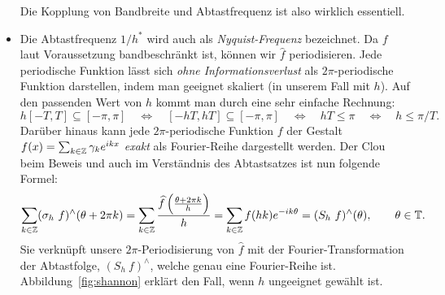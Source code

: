 \begin{remark}
\begin{itemize}
\begin{figure}[ht]
  \end{figure}
  Die Kopplung von Bandbreite und Abtastfrequenz ist also wirklich essentiell.
\item Die Abtastfrequenz $ 1 / h^{*} $ wird auch als \emph{Nyquist-Frequenz} bezeichnet. Da $ f $ 
laut
  Voraussetzung bandbeschränkt ist, können wir $ \widehat{f} $ periodisieren. Jede periodische
  Funktion lässt sich \emph{ohne Informationsverlust} als $ 2\pi $-periodische Funktion darstellen, 
  indem man geeignet skaliert (in unserem Fall mit $ h $). Auf den passenden Wert von $ h $ kommt 
  man durch eine sehr einfache Rechnung:
  \[
    h [-T, T] \subseteq [-\pi, \pi] \quad \Leftrightarrow \quad 
    [-hT, hT] \subseteq [-\pi, \pi] \quad \Leftrightarrow \quad 
    hT \leq \pi \quad \Leftrightarrow \quad 
    h \leq \pi / T.
  \]
  Darüber hinaus kann jede $ 2\pi $-periodische Funktion $ f $ der Gestalt
  $ f(x) = \sum_{k \in \mathbb{Z}} \gamma_{k}e^{ikx} $ \emph{exakt} als Fourier-Reihe dargestellt werden. 
  Der Clou beim Beweis und auch im Verständnis des Abtastsatzes ist nun folgende Formel:
  \[
      \sum_{k \in \mathbb{Z}} (\sigma_{h} \ f)^{\wedge}(\theta + 2 \pi k)
    = \sum_{k \in \mathbb{Z}} \frac{\widehat{f} \left( \frac{\theta + 2\pi k}{h} \right)}{h}
    = \sum_{k \in \mathbb{Z}} f(hk) e^{-ik\theta} 
    = (S_{h} \ f)^{\wedge}(\theta),
      \qquad \theta \in \mathbb{T}.
  \]
  Sie verknüpft unsere $ 2\pi $-Periodisierung von $ \widehat{f} $ mit der Fourier-Transformation 
  der Abtastfolge, $ (S_{h} \ f)^{\wedge} $, welche genau eine Fourier-Reihe ist. 
  Abbildung~\ref{fig:shannon} erklärt den Fall, wenn $ h $ ungeeignet gewählt ist.
  \begin{figure}[ht]
  \centering
  \begin{minipage}{0.49\linewidth}
  \end{minipage}
  \hfill
  \begin{minipage}{0.49\linewidth}
\end{minipage}
\end{figure}
\end{itemize}
\end{remark}
